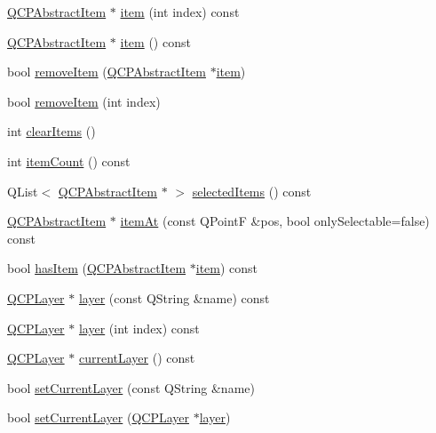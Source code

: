 \begin{DoxyCompactItemize}
\hyperlink{classQCPAbstractItem}{Q\+C\+P\+Abstract\+Item} $\ast$ \hyperlink{classQCustomPlot_a3e842b5a65b1d17fbb96cfb1fa1314d1}{item} (int index) const 
\item 
\hyperlink{classQCPAbstractItem}{Q\+C\+P\+Abstract\+Item} $\ast$ \hyperlink{classQCustomPlot_a700399eae539798c5baf64a37c7f2135}{item} () const 
\item 
bool \hyperlink{classQCustomPlot_ae04446557292551e8fb6e2c106e1848d}{remove\+Item} (\hyperlink{classQCPAbstractItem}{Q\+C\+P\+Abstract\+Item} $\ast$\hyperlink{classQCustomPlot_a3e842b5a65b1d17fbb96cfb1fa1314d1}{item})
\item 
bool \hyperlink{classQCustomPlot_abcfdda3d601c0441cab136137d715dea}{remove\+Item} (int index)
\item 
int \hyperlink{classQCustomPlot_abdfd07d4f0591d0cf967f85013fd3645}{clear\+Items} ()
\item 
int \hyperlink{classQCustomPlot_a6fc860e30df17fd5c46056bf6fe29390}{item\+Count} () const 
\item 
Q\+List$<$ \hyperlink{classQCPAbstractItem}{Q\+C\+P\+Abstract\+Item} $\ast$ $>$ \hyperlink{classQCustomPlot_a1a48b13547e2d9ac5cd6927516f47a2e}{selected\+Items} () const 
\item 
\hyperlink{classQCPAbstractItem}{Q\+C\+P\+Abstract\+Item} $\ast$ \hyperlink{classQCustomPlot_a793e4b04e0ede11a733021907368fa83}{item\+At} (const Q\+PointF \&pos, bool only\+Selectable=false) const 
\item 
bool \hyperlink{classQCustomPlot_ab4199c38b03e63a2623c82453fe8add5}{has\+Item} (\hyperlink{classQCPAbstractItem}{Q\+C\+P\+Abstract\+Item} $\ast$\hyperlink{classQCustomPlot_a3e842b5a65b1d17fbb96cfb1fa1314d1}{item}) const 
\item 
\hyperlink{classQCPLayer}{Q\+C\+P\+Layer} $\ast$ \hyperlink{classQCustomPlot_aac492da01782820454e9136a8db28182}{layer} (const Q\+String \&name) const 
\item 
\hyperlink{classQCPLayer}{Q\+C\+P\+Layer} $\ast$ \hyperlink{classQCustomPlot_a1e73051e371f1815b48d8b355be0d2ab}{layer} (int index) const 
\item 
\hyperlink{classQCPLayer}{Q\+C\+P\+Layer} $\ast$ \hyperlink{classQCustomPlot_af73057345656cbd1463454982d808b00}{current\+Layer} () const 
\item 
bool \hyperlink{classQCustomPlot_a73a6dc47c653bb6f8f030abca5a11852}{set\+Current\+Layer} (const Q\+String \&name)
\item 
bool \hyperlink{classQCustomPlot_a23a4d3cadad1a0063c5fe19aac5659e6}{set\+Current\+Layer} (\hyperlink{classQCPLayer}{Q\+C\+P\+Layer} $\ast$\hyperlink{classQCustomPlot_aac492da01782820454e9136a8db28182}{layer})

\end{DoxyCompactItemize}
